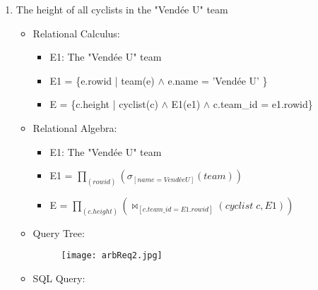 \begin{enumerate}
    \item The height of all cyclists in the "Vendée U" team
        \begin{itemize}
            \item Relational Calculus:
                \begin{itemize}
                    \item E1: The "Vendée U" team
                    \item E1 = \{e.rowid | team(e) $\wedge$ e.name = 'Vendée U' \}
                    \item E = \{c.height | cyclist(c) $\wedge$ E1(e1) $\wedge$ c.team\_id = e1.rowid\}
                \end{itemize}
            \item Relational Algebra:
                \begin{itemize}
                    \item E1: The "Vendée U" team
                    \item E1 = $\prod_{(rowid)} ( \sigma_{[name=Vendée U]} (team) )$
                    \item E = $\prod_{(c.height)} ( \bowtie_{[c.team\_id = E1.rowid]} (cyclist\;c, E1) )$
                \end{itemize}
            \item Query Tree:
            \begin{figure}[H]
            \begin{center}
            \texttt{[image: arbReq2.jpg]}\\
            \end{center}
            \end{figure}
            \item SQL Query:
            
        \end{itemize}
\end{enumerate}
